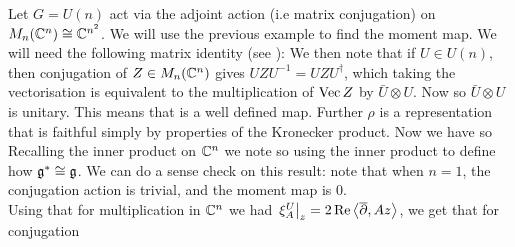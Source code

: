 \documentclass{article}
\begin{document}
\begin{example}
Let $G = U(n)$ act via the adjoint action (i.e matrix conjugation) on $M_n(\mathbb{C}^n) \cong \mathbb{C}^{n^2}$. We will use the previous example to find the moment map. We will need the following matrix identity (see \cite{Horn1991}):
We then note that if $U \in U(n)$, then conjugation of $Z \in M_n(\mathbb{C}^n)$ gives $UZU^{-1} = UZU^\dagger$, which taking the vectorisation is equivalent to the multiplication of $\operatorname{Vec} Z$ by $\bar{U} \otimes U$. Now 
so $\bar{U} \otimes U$ is unitary. This means that
is a well defined map. Further $\rho$ is a representation that is faithful simply by properties of the Kronecker product. Now we have 
so 
Recalling the inner product on $\mathbb{C}^n$
we note 
so 
using the inner product to define how $\mathfrak{g}^\ast \cong \mathfrak{g}$. We can do a sense check on this result: note that when $n=1$, the conjugation action is trivial, and the moment map is 0. \\
Using that for multiplication in $\mathbb{C}^n$ we had $\left. \xi_A^U \right\rvert_{z} = 2\operatorname{Re}\left\langle \overline{\partial},Az \right\rangle$, we get that for conjugation
\end{example}
\end{document}
